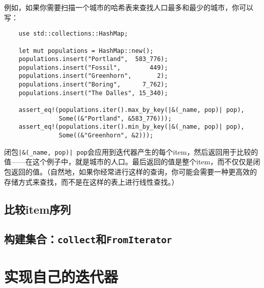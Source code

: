 例如，如果你需要扫描一个城市的哈希表来查找人口最多和最少的城市，你可以写：
\begin{verbatim}
    use std::collections::HashMap;

    let mut populations = HashMap::new();
    populations.insert("Portland",  583_776);
    populations.insert("Fossil",        449);
    populations.insert("Greenhorn",       2);
    populations.insert("Boring",      7_762);
    populations.insert("The Dalles", 15_340);

    assert_eq!(populations.iter().max_by_key(|&(_name, pop)| pop),
               Some((&"Portland", &583_776)));
    assert_eq!(populations.iter().min_by_key(|&(_name, pop)| pop),
               Some((&"Greenhorn", &2)));
\end{verbatim}

闭包\texttt{|\&(\_name, pop)| pop}会应用到迭代器产生的每个item，然后返回用于比较的值——在这个例子中，就是城市的人口。最后返回的值是整个item，而不仅仅是闭包返回的值。（自然地，如果你经常进行这样的查询，你可能会需要一种更高效的存储方式来查找，而不是在这样的表上进行线性查找。）

\subsection{比较item序列}


\subsection{构建集合：\texttt{collect}和\texttt{FromIterator}}\label{BuildColl}

\section{实现自己的迭代器}